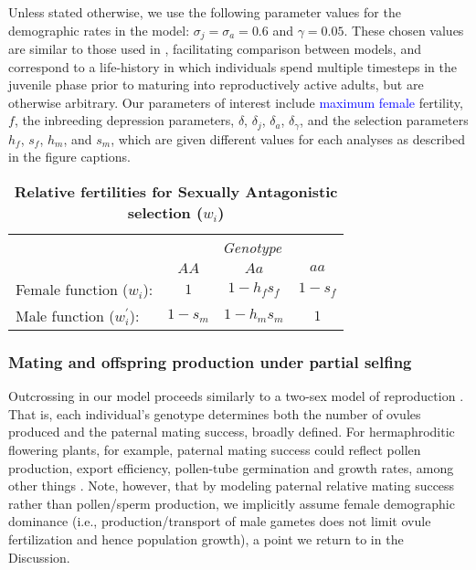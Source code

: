 \documentclass[11pt]{article}
\begin{document}
Unless stated otherwise, we use the following parameter values for the demographic rates in the model: $\sigma_j = \sigma_a = 0.6$ and $\gamma = 0.05$. These chosen values are similar to those used in \citet{deVriesCaswell2019b}, facilitating comparison between models, and correspond to a life-history in which individuals spend multiple timesteps in the juvenile phase prior to maturing into reproductively active adults, but are otherwise arbitrary. Our parameters of interest include \textcolor{blue}{maximum female} fertility, $f$, the inbreeding depression parameters, $\delta$, $\delta_j$, $\delta_a$, $\delta_{\gamma}$, and the selection parameters $h_f$, $s_f$, $h_m$, and $s_m$, which are given different values for each analyses as described in the figure captions. 

\begin{table}[htbp]
 \centering
 \caption{\bf Relative fertilities for Sexually Antagonistic selection ($w_{i}$)}
\label{tab:Fitness}
\begin{tabular}{lccc}
 \toprule
					&  \multicolumn{3}{c}{{\textit{Genotype}}} \\ 
\cline{2-4}
					& $AA$			& $Aa$ 					& $aa$ 		\\ \hline
Female function ($w_{i}$):	& $1$		& $1 - h_f s_f$	& $1 - s_f$ \\	
Male function ($w^{\prime}_{i}$):		& $1 - s_m$& $1 - h_m s_m$	& $1$ 		\\	
\hline
\end{tabular}
\end{table}

\subsubsection*{Mating and offspring production under partial selfing}

 Outcrossing in our model proceeds similarly to a two-sex model of reproduction \citep{deVriesCaswell2019b}. That is, each individual's genotype determines both the number of ovules produced and the paternal mating success, broadly defined. For hermaphroditic flowering plants, for example, paternal mating success could reflect pollen production, export efficiency, pollen-tube germination and growth rates, among other things \citep{LloydWebb1986, WangBarrett2020, Harder2016}. Note, however, that by modeling paternal relative mating success rather than pollen/sperm production, we implicitly assume female demographic dominance (i.e., production/transport of male gametes does not limit ovule fertilization and hence population growth), a point we return to in the Discussion. 
\end{document}
